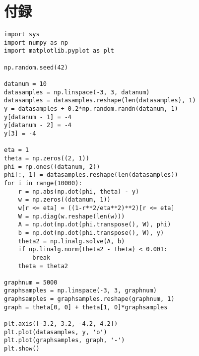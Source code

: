 \documentclass[9pt]{ltjsarticle}
\begin{document}
\section*{付録}
\tiny
\begin{verbatim}
import sys
import numpy as np
import matplotlib.pyplot as plt

np.random.seed(42)

datanum = 10
datasamples = np.linspace(-3, 3, datanum)
datasamples = datasamples.reshape(len(datasamples), 1)
y = datasamples + 0.2*np.random.randn(datanum, 1)
y[datanum - 1] = -4
y[datanum - 2] = -4
y[3] = -4

eta = 1
theta = np.zeros((2, 1))
phi = np.ones((datanum, 2))
phi[:, 1] = datasamples.reshape(len(datasamples))
for i in range(10000):
    r = np.abs(np.dot(phi, theta) - y)
    w = np.zeros((datanum, 1))
    w[r <= eta] = ((1-r**2/eta**2)**2)[r <= eta]
    W = np.diag(w.reshape(len(w)))
    A = np.dot(np.dot(phi.transpose(), W), phi)
    b = np.dot(np.dot(phi.transpose(), W), y)
    theta2 = np.linalg.solve(A, b)
    if np.linalg.norm(theta2 - theta) < 0.001:
        break
    theta = theta2

graphnum = 5000
graphsamples = np.linspace(-3, 3, graphnum)
graphsamples = graphsamples.reshape(graphnum, 1)
graph = theta[0, 0] + theta[1, 0]*graphsamples

plt.axis([-3.2, 3.2, -4.2, 4.2])    
plt.plot(datasamples, y, 'o')
plt.plot(graphsamples, graph, '-')
plt.show()
\end{verbatim}
\end{document}
